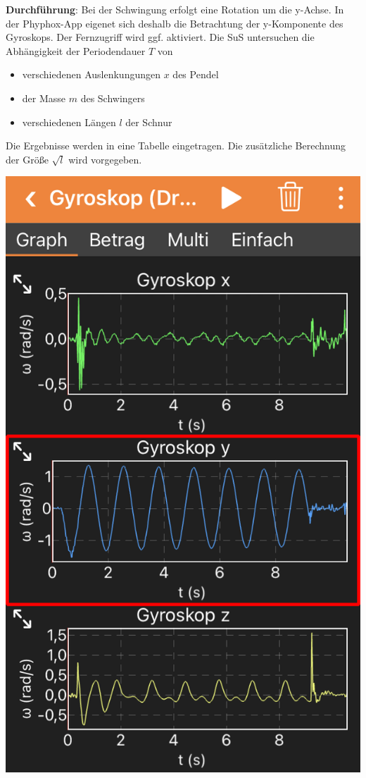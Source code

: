\documentclass[../main.tex]{subfiles}
\begin{document}
\begin{tcolorbox}
    \vspace{0.5cm}
    \begin{minipage}[]{0.75\textwidth}
        \textbf{Durchführung}: Bei der Schwingung erfolgt eine Rotation um die y-Achse. In der Phyphox-App eigenet sich deshalb die Betrachtung der y-Komponente des Gyroskops. Der Fernzugriff wird ggf. aktiviert. Die SuS untersuchen die Abhängigkeit der Periodendauer $T$ von 
        \begin{itemize}[noitemsep]
            \item verschiedenen Auslenkungungen $x$ des Pendel
            \item der Masse $m$ des Schwingers 
            \item verschiedenen Längen $l$ der Schnur
        \end{itemize}
        Die Ergebnisse werden in eine Tabelle eingetragen. Die zusätzliche Berechnung der Größe $\sqrt{l}$ wird vorgegeben.

    \end{minipage}
    \hspace{0.1cm}
    \begin{minipage}[]{0.2\textwidth}
        \includegraphics[width=1.1\textwidth]{img/app2}
    \end{minipage}
    

\end{tcolorbox}
\end{document}
